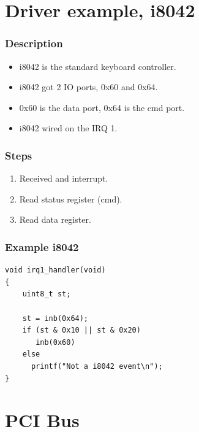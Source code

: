 \section{Driver example, i8042}

\begin{frame}
\frametitle{Description}
\begin{itemize}
\item i8042 is the standard keyboard controller.
\item i8042 got 2 IO ports, 0x60 and 0x64.
\item 0x60 is the data port, 0x64 is the cmd port.
\item i8042 wired on the IRQ 1.
\end{itemize}
\end{frame}

\begin{frame}
\frametitle{Steps}
\begin{enumerate}
\item Received and interrupt.
\item Read status register (cmd).
\item Read data register.
\end{enumerate}
\end{frame}

\begin{frame}[fragile]
\frametitle{Example i8042}
\begin{verbatim}
void irq1_handler(void)
{
    uint8_t st;

    st = inb(0x64);
    if (st & 0x10 || st & 0x20)
       inb(0x60)
    else
      printf("Not a i8042 event\n");
}
\end{verbatim}
\end{frame}


\section{PCI Bus}
